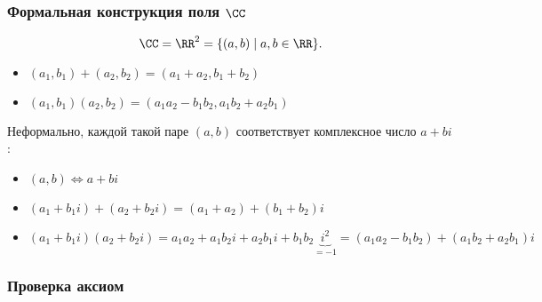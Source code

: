 \subsubsection{Формальная конструкция поля $\CC$}

\begin{equation*}
    \CC = \RR^2 = \{(a, b) \mid a, b \in \RR\}
.\end{equation*}

\begin{itemize}
\item $(a_1, b_1) + (a_2, b_2) = (a_1 + a_2, b_1 + b_2)$
\item $(a_1, b_1) (a_2, b_2) = (a_1 a_2 - b_1 b_2, a_1 b_2 + a_2 b_1)$
\end{itemize}

Неформально, каждой такой паре $(a, b)$ соответствует комплексное число $a + bi$:
\begin{itemize}
\item $(a, b) \iff a + bi$
\item $(a_1 + b_1 i) + (a_2 + b_2 i) = (a_1 + a_2) + (b_1 + b_2)i$
\item $(a_1 + b_1 i) (a_2 + b_2 i) = a_1 a_2 + a_1 b_2 i + a_2 b_1 i + b_1 b_2 \underbrace{i^2}_{= -1} = (a_1 a_2 - b_1 b_2) + (a_1 b_2 + a_2 b_1) i$
\end{itemize}

\subsubsection{Проверка аксиом}


